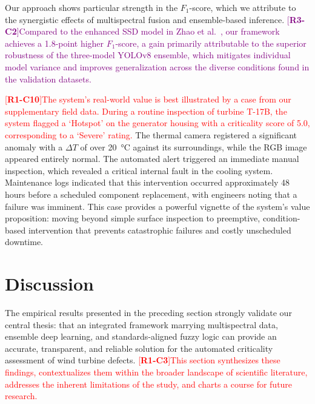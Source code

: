 \documentclass[energies,article,submit,pdftex,moreauthors]{Definitions/mdpi}
\newcommand{\revtag}[2]{[\textbf{R#1-C#2}]}
\newcommand{\Rone}[1]{\textcolor{red}{#1}}
\newcommand{\Rthree}[1]{\textcolor{purple}{#1}}
\begin{document}
Our approach shows particular strength in the \(F_{1}\)-score, which we attribute to the synergistic effects of multispectral fusion and ensemble-based inference. \Rthree{\revtag{3}{2}Compared to the enhanced SSD model in Zhao et al.~\cite{Zhao2024Enhanced}, our framework achieves a 1.8-point higher \(F_1\)-score, a gain primarily attributable to the superior robustness of the three-model YOLOv8 ensemble, which mitigates individual model variance and improves generalization across the diverse conditions found in the validation datasets.}

\Rone{\revtag{1}{10}The system's real-world value is best illustrated by a case from our supplementary field data. During a routine inspection of turbine T-17B, the system flagged a `Hotspot' on the generator housing with a criticality score of 5.0, corresponding to a `Severe' rating.} The thermal camera registered a significant anomaly with a \(\Delta T\) of over \SI{20}{\celsius} against its surroundings, while the RGB image appeared entirely normal. The automated alert triggered an immediate manual inspection, which revealed a critical internal fault in the cooling system. Maintenance logs indicated that this intervention occurred approximately 48 hours before a scheduled component replacement, with engineers noting that a failure was imminent. This case provides a powerful vignette of the system's value proposition: moving beyond simple surface inspection to preemptive, condition-based intervention that prevents catastrophic failures and costly unscheduled downtime.

\section{Discussion}\label{sec:discussion}

The empirical results presented in the preceding section strongly validate our central thesis: that an integrated framework marrying multispectral data, ensemble deep learning, and standards-aligned fuzzy logic can provide an accurate, transparent, and reliable solution for the automated criticality assessment of wind turbine defects. \Rone{\revtag{1}{3}This section synthesizes these findings, contextualizes them within the broader landscape of scientific literature, addresses the inherent limitations of the study, and charts a course for future research.}
\end{document}
